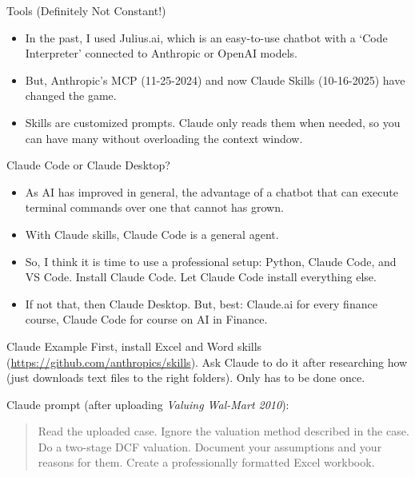 \documentclass[aspectratio=169]{beamer}
\begin{document}
\begin{frame}{Tools (Definitely Not Constant!)}
\begin{itemize}
\item In the past, I used Julius.ai, which is an easy-to-use chatbot with a `Code Interpreter' connected to Anthropic or OpenAI models.
\item But, Anthropic's MCP (11-25-2024) and now Claude Skills (10-16-2025) have changed the game.
\item Skills are customized prompts.  Claude only reads them when needed, so you can have many without overloading the context window. 
\end{itemize}
\end{frame}



\begin{frame}{Claude Code or Claude Desktop?}
\begin{itemize}
\item As AI has improved in general, the advantage of a chatbot that can execute terminal commands over one that cannot has grown.
\item With Claude skills, Claude Code is a general agent.
\item So, I think it is time to use a professional setup: Python, Claude Code, and VS Code.  Install Claude Code.  Let Claude Code install everything else.
\item If not that, then Claude Desktop.  But, best: Claude.ai for every finance course, Claude Code for course on AI in Finance.
\end{itemize}
\end{frame}

\begin{frame}{Claude Example}
First, install Excel and Word skills (\url{https://github.com/anthropics/skills}).  
Ask Claude to do it after researching how (just downloads text files to the right folders).  Only has to be done once.


\vspace{1em}
Claude prompt (after uploading \textit{Valuing Wal-Mart 2010}):

\vspace{1em}
\begin{quote}
Read the uploaded case. Ignore the valuation method described in the case. Do a two-stage DCF valuation. Document your assumptions and your reasons for them. Create a professionally formatted Excel workbook. 
\end{quote}
\end{frame}
\end{document}
